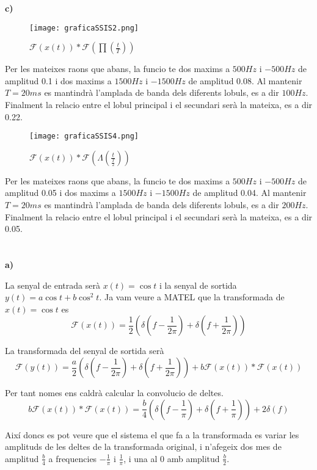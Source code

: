 \documentclass[12pt, a4papre]{article}
\begin{document}
	\newpage
	\textbf{c)}
	\begin{figure}[H]
		\begin{center}
		\texttt{[image: graficaSSIS2.png]}
		\end{center}
		\caption{$\mathcal{F}(x(t))*\mathcal{F}(\prod(\frac{t}{T}))$}
	\end{figure}
	
	Per les mateixes raons que abans, la funcio te dos maxims a $500Hz$ i $-500Hz$ de amplitud 0.1 i dos maxims a $1500Hz$ i $-1500Hz$ de amplitud 0.08. Al mantenir $T = 20ms$ es mantindrà l'amplada de banda dels diferents lobuls, es a dir $100Hz$. Finalment la relacio entre el lobul principal i el secundari serà la mateixa, es a dir 0.22.
	
	\begin{figure}[H]
		\begin{center}
		\texttt{[image: graficaSSIS4.png]}
		\end{center}
		\caption{$\mathcal{F}(x(t))*\mathcal{F}(\Lambda(\frac{t}{\frac{T}{2}}))$}
	\end{figure}
	
	Per les mateixes raons que abans, la funcio te dos maxims a $500Hz$ i $-500Hz$ de amplitud 0.05 i dos maxims a $1500Hz$ i $-1500Hz$ de amplitud 0.04. Al mantenir $T = 20ms$ es mantindrà l'amplada de banda dels diferents lobuls, es a dir $200Hz$. Finalment la relacio entre el lobul principal i el secundari serà la mateixa, es a dir 0.05.
	
	\newpage
	\section{}
	\textbf{a)}
	
	La senyal de entrada  serà $x(t)=\cos{t}$ i la senyal de sortida  $y(t)=a\cos{t} + b\cos^2{t}$.  Ja vam veure a MATEL que la transformada de $x(t)=\cos{t}$ es 
	\[\mathcal{F}(x(t)) = \frac{1}{2}(\delta(f - \frac{1}{2\pi}) + \delta(f + \frac{1}{2\pi}))\]
	
	La transformada del senyal de sortida serà
	\[\mathcal{F}(y(t)) = \frac{a}{2}(\delta(f - \frac{1}{2\pi}) + \delta(f + \frac{1}{2\pi})) + b\mathcal{F}(x(t))*\mathcal{F}(x(t)) \]
	
	Per tant nomes ens caldrà calcular la convolucio de deltes.
	\[b\mathcal{F}(x(t))*\mathcal{F}(x(t)) = \frac{b}{4}(\delta(f - \frac{1}{\pi}) + \delta(f + \frac{1}{\pi})) + 2\delta(f) \]
	
	Així doncs es pot veure que el sistema el que fa a la transformada es variar les amplituds de les deltes de la transformada original, i n'afegeix dos mes de amplitud $\frac{b}{4}$ a frequencies $-\frac{1}{\pi}$ i $\frac{1}{\pi}$, i una al 0 amb amplitud $\frac{b}{2}$.
	
\end{document}
